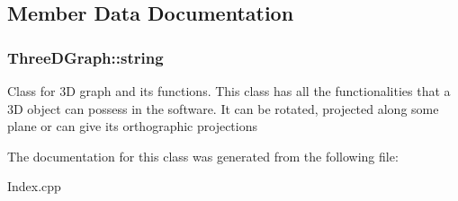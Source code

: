 \subsection{Member Data Documentation}
\subsubsection[{\texorpdfstring{string}{string}}]{\setlength{\rightskip}{0pt plus 5cm}Three\+D\+Graph\+::string}\hypertarget{classThreeDGraph_aa428236bdac3937b96f2d361161eaae5}{}\label{classThreeDGraph_aa428236bdac3937b96f2d361161eaae5}
Class for 3D graph and its functions. This class has all the functionalities that a 3D object can possess in the software. It can be rotated, projected along some plane or can give its orthographic projections 

The documentation for this class was generated from the following file\+:\begin{DoxyCompactItemize}
\item 
Index.\+cpp\end{DoxyCompactItemize}
